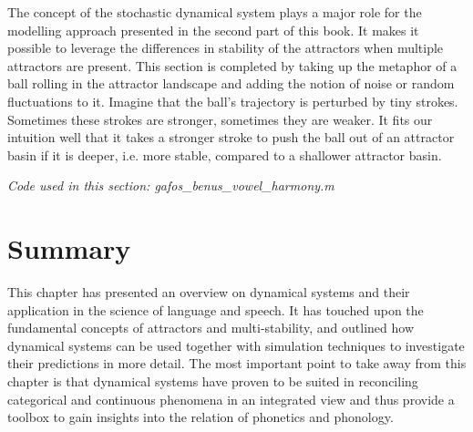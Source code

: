 The concept of the stochastic dynamical system plays a major role for the modelling approach presented in the second part of this book. It makes it possible to leverage the differences in stability of the attractors when multiple attractors are present. This section is completed by taking up the metaphor of a ball rolling in the attractor landscape and adding the notion of noise or random fluctuations to it. Imagine that the ball's trajectory is perturbed by tiny strokes. Sometimes these strokes are stronger, sometimes they are weaker. It fits our intuition well that it takes a stronger stroke to push the ball out of an attractor basin if it is deeper, i.e. more stable, compared to a shallower attractor basin.

\medskip\noindent \textit{Code used in this section: gafos\_benus\_vowel\_harmony.m}

\section{Summary}
This chapter has presented an overview on dynamical systems and their application in the science of language and speech. It has touched upon the fundamental concepts of attractors and multi-stability, and outlined how dynamical systems can be used together with simulation techniques to investigate their predictions in more detail. The most important point to take away from this chapter is that dynamical systems have proven to be suited in reconciling categorical and continuous phenomena in an integrated view and thus provide a toolbox to gain insights into the relation of phonetics and phonology.
